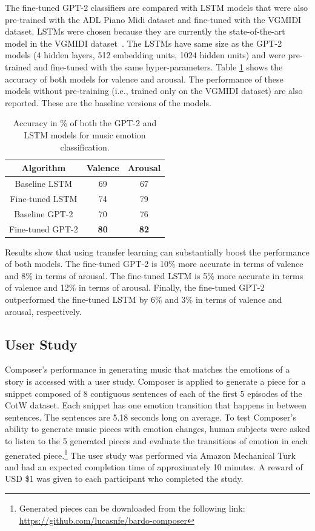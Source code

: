 The fine-tuned GPT-2 classifiers are compared with LSTM models that were also pre-trained with the ADL Piano Midi dataset and fine-tuned with the VGMIDI dataset. LSTMs were chosen because they are currently the state-of-the-art model in the VGMIDI dataset~\cite{ferreira_2019}. The LSTMs have same size as the GPT-2 models (4 hidden layers, 512 embedding units, 1024 hidden units) and were pre-trained and fine-tuned with the same hyper-parameters. Table \ref{tab:sent_accuracy} shows the accuracy of both models for valence and arousal. The performance of these models without pre-training (i.e., trained only on the VGMIDI dataset) are also reported. These are the baseline versions of the models.

\begin{table}[h!]
    \centering
    \begin{tabular}{ccc}
    \toprule
    \textbf{Algorithm} & \textbf{Valence} & \textbf{Arousal} \\
    \midrule
    Baseline LSTM & 69 & 67 \\
    Fine-tuned LSTM & 74 & 79 \\
    Baseline GPT-2 & 70 & 76 \\
    Fine-tuned GPT-2 & \textbf{80} & \textbf{82} \\
    \bottomrule
    \end{tabular}
    \caption{Accuracy in \% of both the GPT-2 and LSTM models for music emotion classification. }
    \label{tab:sent_accuracy}
\end{table}

Results show that using transfer learning can substantially boost the performance of both models. The fine-tuned GPT-2 is 10\% more accurate in terms of valence and 8\% in terms of arousal. The fine-tuned LSTM is 5\% more accurate in terms of valence and 12\% in terms of arousal. Finally, the fine-tuned GPT-2 outperformed the fine-tuned LSTM by 6\% and 3\% in terms of valence and arousal, respectively.

\subsection{User Study}

Composer's performance in generating music that matches the emotions of a story is accessed with a user study. Composer is applied to generate a piece for a snippet composed of 8 contiguous sentences of each of the first 5 episodes of the CotW dataset. Each snippet has one emotion transition that happens in between sentences. The sentences are 5.18 seconds long on average. To test Composer's ability to generate music pieces with emotion changes, human subjects were asked to listen to the 5 generated pieces and evaluate the transitions of emotion in each generated piece.\footnote{Generated pieces can be downloaded from the following link: \url{https://github.com/lucasnfe/bardo-composer}} The user study was performed via Amazon Mechanical Turk and had an expected completion time of approximately 10 minutes. A reward of USD \$1 was given to each participant who completed the study.

